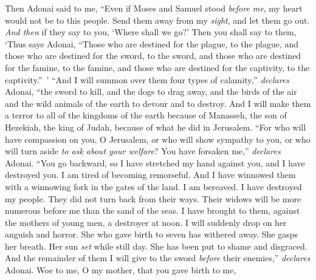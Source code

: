 \begin{biblechapter} %
 Then Adonai said to me, “Even if Moses and Samuel stood \textit{before me}, my heart would not be to this people. Send them away from my \textit{sight}, and let them go out.
\verse \textit{And then} if they say to you, ‘Where shall we go?’ Then you shall say to them, ‘Thus says Adonai, “Those who are destined for the plague, to the plague, 
and those who are destined for the sword, to the sword, 
and those who are destined for the famine, to the famine, 
and those who are destined for the captivity, to the captivity.” ’
\verse “And I will summon over them four types of calamity,” \textit{declares} Adonai, “the sword to kill, and the dogs to drag away, and the birds of the air and the wild animals of the earth to devour and to destroy.
\verse And I will make them a terror to all of the kingdoms of the earth because of Manasseh, the son of Hezekiah, the king of Judah, because of what he did in Jerusalem.
\verse “For who will have compassion on you, O Jerusalem, 
or who will show sympathy to you, 
or who will turn aside \textit{to ask about your welfare}?
\verse You have forsaken me,” \textit{declares} Adonai. 
“You go backward, so I have stretched my hand against you, 
and I have destroyed you. 
I am tired of becoming remorseful.
\verse And I have winnowed them with a winnowing fork in the gates of the land. 
I am bereaved. 
I have destroyed my people. 
They did not turn back from their ways.
\verse Their widows will be more numerous before me than the sand of the seas. 
I have brought to them, against the mothers of young men, 
a destroyer at noon. 
I will suddenly drop on her anguish and horror.
\verse She who gave birth to seven has withered away. 
She gasps her breath. 
Her sun \textit{set} while still day. 
She has been put to shame and disgraced. 
And the remainder of them I will give to the sword 
\textit{before} their enemies,” \textit{declares} Adonai.
 Woe to me, O my mother, that you gave birth to me, 

\end{biblechapter}
